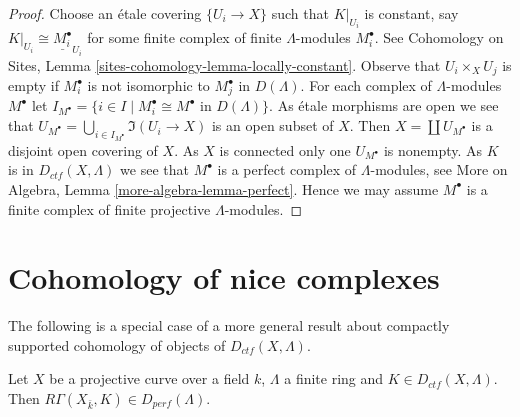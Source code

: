 \begin{proof}
Choose an \'etale covering $\{U_i \to X\}$ such that $K|_{U_i}$
is constant, say $K|_{U_i} \cong \underline{M_i^\bullet}_{U_i}$
for some finite complex of finite $\Lambda$-modules $M_i^\bullet$.
See Cohomology on Sites, Lemma
\ref{sites-cohomology-lemma-locally-constant}.
Observe that $U_i \times_X U_j$ is empty if $M_i^\bullet$
is not isomorphic to $M_j^\bullet$ in $D(\Lambda)$.
For each complex of $\Lambda$-modules $M^\bullet$ let
$I_{M^\bullet} =
\{i \in I \mid M_i^\bullet \cong M^\bullet\text{ in }D(\Lambda)\}$.
As \'etale morphisms are open we see that
$U_{M^\bullet} = \bigcup_{i \in I_{M^\bullet}} \Im(U_i \to X)$
is an open subset of $X$. Then $X = \coprod U_{M^\bullet}$ is a disjoint
open covering of $X$. As $X$ is connected only one $U_{M^\bullet}$
is nonempty. As $K$ is in $D_{ctf}(X, \Lambda)$ we see that $M^\bullet$
is a perfect complex of $\Lambda$-modules, see
More on Algebra, Lemma \ref{more-algebra-lemma-perfect}.
Hence we may assume $M^\bullet$ is a finite complex of finite projective
$\Lambda$-modules.
\end{proof}








\section{Cohomology of nice complexes}
\label{section-cohomology-ctf}

\noindent
The following is a special case of a more general result about
compactly supported cohomology of objects of $D_{ctf}(X, \Lambda)$.

\begin{proposition}
\label{proposition-projective-curve-constructible-cohomology}
Let $X$ be a projective curve over a field $k$, $\Lambda$ a finite ring and
$K\in D_{ctf}(X, \Lambda)$. Then $R\Gamma(X_{\bar k}, K)\in
D_{perf}(\Lambda)$.
\end{proposition}

